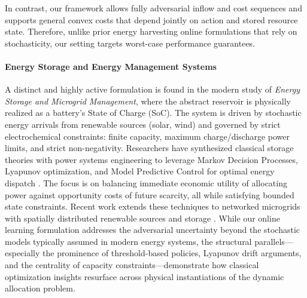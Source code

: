\documentclass[11pt]{article}
\begin{document}
In contrast, our framework allows fully adversarial inflow and cost sequences and supports general convex costs that depend jointly on action and stored resource state. Therefore, unlike prior energy harvesting online formulations that rely on stochasticity, our setting targets worst-case performance guarantees.






\paragraph{Energy Storage and Energy Management Systems}
A distinct and highly active formulation is found in the modern study of \emph{Energy Storage and Microgrid Management}, where the abstract reservoir is physically realized as a battery's State of Charge (SoC). The system is driven by stochastic energy arrivals from renewable sources (solar, wind) and governed by strict electrochemical constraints: finite capacity, maximum charge/discharge power limits, and strict non-negativity. Researchers have synthesized classical storage theories with power systems engineering to leverage Markov Decision Processes, Lyapunov optimization, and Model Predictive Control for optimal energy dispatch \cite{sudevalayam2011energy,urgaonkar2011optimal,ozel2011optimal}. The focus is on balancing immediate economic utility of allocating power against opportunity costs of future scarcity, all while satisfying bounded state constraints. Recent work extends these techniques to networked microgrids with spatially distributed renewable sources and storage \cite{sun2014real,yang2011optimal}. While our online learning formulation addresses the adversarial uncertainty beyond the stochastic models typically assumed in modern energy systems, the structural parallels---especially the prominence of threshold-based policies, Lyapunov drift arguments, and the centrality of capacity constraints---demonstrate how classical optimization insights resurface across physical instantiations of the dynamic allocation problem.
\end{document}
